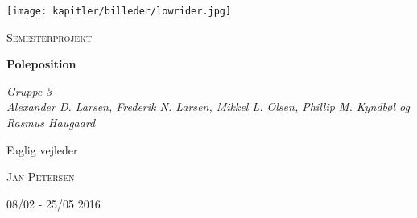 
\begin{titlepage}
	\centering
	\texttt{[image: kapitler/billeder/lowrider.jpg]}
	\vspace{1cm}
	{\scshape\Large Semesterprojekt\par}
	\vspace{1.5cm}
	{\huge\bfseries Poleposition\par}
	\vspace{2cm}
	{\Large\itshape Gruppe 3 \\
	Alexander D. Larsen, Frederik N. Larsen, Mikkel L. Olsen, Phillip M. Kyndbøl og Rasmus Haugaard\par}
	\vfill
	Faglig vejleder\par
	\textsc{Jan Petersen}

	\vfill

	{\large 08/02 - 25/05 2016}
\end{titlepage}
